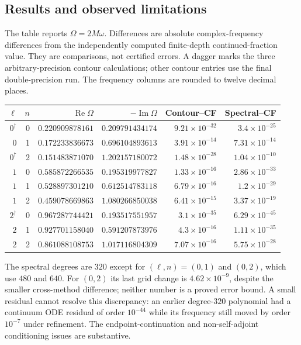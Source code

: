 \subsection{Results and observed limitations}
The table reports $\Omega=2M\omega$. Differences are absolute complex-frequency differences from the independently computed finite-depth continued-fraction value. They are comparisons, not certified errors. A dagger marks the three arbitrary-precision contour calculations; other contour entries use the final double-precision run. The frequency columns are rounded to twelve decimal places.
\begin{center}\small
\begin{tabular}{rrrrrr}\toprule
$\ell$ & $n$ & $\operatorname{Re}\Omega$ & $-\operatorname{Im}\Omega$ & Contour--CF & Spectral--CF\\\midrule
$0^{\dagger}$ & 0 & $0.220909878161$ & $0.209791434174$ & $9.21\times10^{-32}$ & $3.4\times10^{-25}$ \\
$0$ & 1 & $0.172233836673$ & $0.696104893613$ & $3.91\times10^{-14}$ & $7.31\times10^{-14}$ \\
$0^{\dagger}$ & 2 & $0.151483871070$ & $1.202157180072$ & $1.48\times10^{-28}$ & $1.04\times10^{-10}$ \\
$1$ & 0 & $0.585872266535$ & $0.195319977827$ & $1.33\times10^{-16}$ & $2.86\times10^{-33}$ \\
$1$ & 1 & $0.528897301210$ & $0.612514783118$ & $6.79\times10^{-16}$ & $1.2\times10^{-29}$ \\
$1$ & 2 & $0.459078669863$ & $1.080266850038$ & $6.41\times10^{-15}$ & $3.37\times10^{-19}$ \\
$2^{\dagger}$ & 0 & $0.967287744421$ & $0.193517551957$ & $3.1\times10^{-35}$ & $6.29\times10^{-45}$ \\
$2$ & 1 & $0.927701158040$ & $0.591207873976$ & $4.3\times10^{-16}$ & $1.11\times10^{-35}$ \\
$2$ & 2 & $0.861088108753$ & $1.017116804309$ & $7.07\times10^{-16}$ & $5.75\times10^{-28}$ \\
\bottomrule\end{tabular}\end{center}

The spectral degrees are $320$ except for $(\ell,n)=(0,1)$ and $(0,2)$, which use $480$ and $640$. For $(0,2)$ its last grid change is $4.62\times10^{-9}$, despite the smaller cross-method difference; neither number is a proved error bound. A small residual cannot resolve this discrepancy: an earlier degree-$320$ polynomial had a continuum ODE residual of order $10^{-44}$ while its frequency still moved by order $10^{-7}$ under refinement. The endpoint-continuation and non-self-adjoint conditioning issues are substantive.

